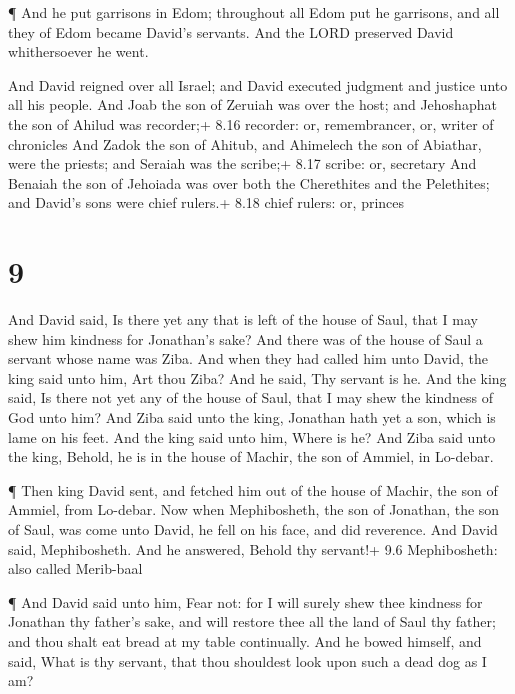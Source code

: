  ¶ And he put garrisons in Edom; throughout all Edom put he
garrisons, and all they of Edom became David's servants. And the LORD
preserved David whithersoever he went.

 And David reigned over all Israel; and David executed
judgment and justice unto all his people.  And Joab the son
of Zeruiah was over the host; and Jehoshaphat the son of Ahilud was
recorder;+ 8.16 recorder: or, remembrancer, or, writer of chronicles
 And Zadok the son of Ahitub, and Ahimelech the son of
Abiathar, were the priests; and Seraiah was the scribe;+ 8.17 scribe:
or, secretary  And Benaiah the son of Jehoiada was over
both the Cherethites and the Pelethites; and David's sons were chief
rulers.+ 8.18 chief rulers: or, princes

\hypertarget{section-8}{%
\section{9}\label{section-8}}

 And David said, Is there yet any that is left of the house
of Saul, that I may shew him kindness for Jonathan's sake? 
And there was of the house of Saul a servant whose name was Ziba. And
when they had called him unto David, the king said unto him, Art thou
Ziba? And he said, Thy servant is he.  And the king said, Is
there not yet any of the house of Saul, that I may shew the kindness of
God unto him? And Ziba said unto the king, Jonathan hath yet a son,
which is lame on his feet.  And the king said unto him,
Where is he? And Ziba said unto the king, Behold, he is in the house of
Machir, the son of Ammiel, in Lo-debar.

 ¶ Then king David sent, and fetched him out of the house of
Machir, the son of Ammiel, from Lo-debar.  Now when
Mephibosheth, the son of Jonathan, the son of Saul, was come unto David,
he fell on his face, and did reverence. And David said, Mephibosheth.
And he answered, Behold thy servant!+ 9.6 Mephibosheth: also called
Merib-baal

 ¶ And David said unto him, Fear not: for I will surely shew
thee kindness for Jonathan thy father's sake, and will restore thee all
the land of Saul thy father; and thou shalt eat bread at my table
continually.  And he bowed himself, and said, What is thy
servant, that thou shouldest look upon such a dead dog as I am?

